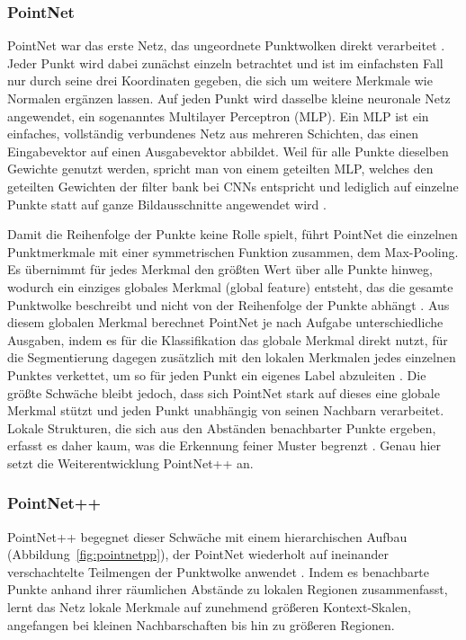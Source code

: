 \subsubsection{PointNet}\label{pointnet}

PointNet war das erste Netz, das ungeordnete Punktwolken direkt verarbeitet \cite{Qi.2017a}. Jeder Punkt wird dabei zunächst einzeln betrachtet und ist im einfachsten Fall nur durch seine drei Koordinaten gegeben, die sich um weitere Merkmale wie Normalen ergänzen lassen. Auf jeden Punkt wird dasselbe kleine neuronale Netz angewendet, ein sogenanntes Multilayer Perceptron (MLP). Ein MLP ist ein einfaches, vollständig verbundenes Netz aus mehreren Schichten, das einen Eingabevektor auf einen Ausgabevektor abbildet. Weil für alle Punkte dieselben Gewichte genutzt werden, spricht man von einem geteilten MLP, welches den geteilten Gewichten der filter bank bei CNNs entspricht und lediglich auf einzelne Punkte statt auf ganze Bildausschnitte angewendet wird \cite{Qi.2017a}.

Damit die Reihenfolge der Punkte keine Rolle spielt, führt PointNet die einzelnen Punktmerkmale mit einer symmetrischen Funktion zusammen, dem Max-Pooling. Es übernimmt für jedes Merkmal den größten Wert über alle Punkte hinweg, wodurch ein einziges globales Merkmal (global feature) entsteht, das die gesamte Punktwolke beschreibt und nicht von der Reihenfolge der Punkte abhängt \cite{Qi.2017a}. Aus diesem globalen Merkmal berechnet PointNet je nach Aufgabe unterschiedliche Ausgaben, indem es für die Klassifikation das globale Merkmal direkt nutzt, für die Segmentierung dagegen zusätzlich mit den lokalen Merkmalen jedes einzelnen Punktes verkettet, um so für jeden Punkt ein eigenes Label abzuleiten \cite{Qi.2017a}. Die größte Schwäche bleibt jedoch, dass sich PointNet stark auf dieses eine globale Merkmal stützt und jeden Punkt unabhängig von seinen Nachbarn verarbeitet. Lokale Strukturen, die sich aus den Abständen benachbarter Punkte ergeben, erfasst es daher kaum, was die Erkennung feiner Muster begrenzt \cite{Qi.2017b}. Genau hier setzt die Weiterentwicklung PointNet++ an.

\subsubsection{PointNet++}\label{pointnet++}

PointNet++ begegnet dieser Schwäche mit einem hierarchischen Aufbau (Abbildung~\ref{fig:pointnetpp}), der PointNet wiederholt auf ineinander verschachtelte Teilmengen der Punktwolke anwendet \cite{Qi.2017b}. Indem es benachbarte Punkte anhand ihrer räumlichen Abstände zu lokalen Regionen zusammenfasst, lernt das Netz lokale Merkmale auf zunehmend größeren Kontext-Skalen, angefangen bei kleinen Nachbarschaften bis hin zu größeren Regionen.


